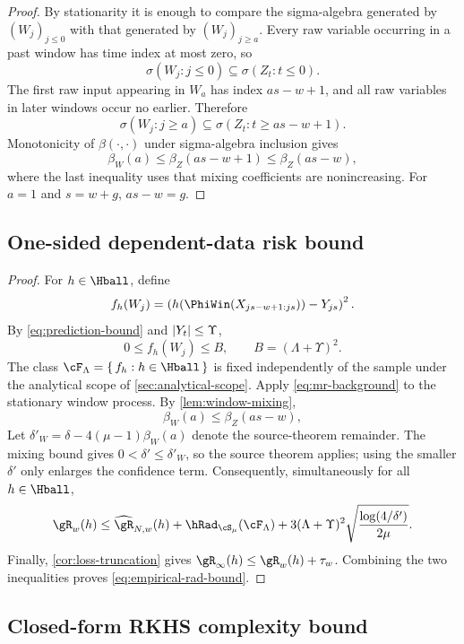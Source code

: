 \begin{proof}
By stationarity it is enough to compare the sigma-algebra generated by
\((W_j)_{j\leq0}\) with that generated by \((W_j)_{j\geq a}\). Every raw
variable occurring in a past window has time index at most zero, so
\[
    \sigma(W_j:j\leq0)
    \subseteq
    \sigma(Z_t:t\leq0).
\]
The first raw input appearing in \(W_a\) has index \(as-w+1\), and all raw
variables in later windows occur no earlier. Therefore
\[
    \sigma(W_j:j\geq a)
    \subseteq
    \sigma(Z_t:t\geq as-w+1).
\]
Monotonicity of \(\beta(\cdot,\cdot)\) under sigma-algebra inclusion gives
\[
    \beta_W(a)
    \leq
    \beta_Z(as-w+1)
    \leq
    \beta_Z(as-w),
\]
where the last inequality uses that mixing coefficients are nonincreasing.
For \(a=1\) and \(s=w+g\), \(as-w=g\).
\end{proof}

\subsection{One-sided dependent-data risk bound}

\begin{proof}
For \(h\in\Hball\), define
\[
    f_h(W_j)
    =
    \left(
      h(\PhiWin(X_{js-w+1:js}))-Y_{js}
    \right)^2.
\]
By \cref{eq:prediction-bound} and \(\left| Y_t \right|\leq\Upsilon\),
\[
    0\leq f_h(W_j)\leq B,
    \qquad B=(\Lambda+\Upsilon)^2.
\]
The class \(\cF_\Lambda=\set{f_h:h\in\Hball}\) is fixed independently of the
sample under the analytical scope of \cref{sec:analytical-scope}. Apply \cref{eq:mr-background} to the
stationary window process. By \cref{lem:window-mixing},
\[
    \beta_W(a)
    \leq\beta_Z(as-w),
\]
Let \(\delta'_W=\delta-4(\mu-1)\beta_W(a)\) denote the source-theorem
remainder. The mixing bound gives \(0<\delta'\leq\delta'_W\), so the source
theorem applies; using the smaller \(\delta'\) only enlarges the confidence
term. Consequently, simultaneously for all \(h\in\Hball\),
\[
    \risk_w(h)
    \leq
    \erisk_{N,w}(h)
    +\hRad_{\cS_\mu}(\cF_\Lambda)
    +3(\Lambda+\Upsilon)^2
      \sqrt{\frac{\log(4/\delta')}{2\mu}}.
\]
Finally, \cref{cor:loss-truncation} gives
\(\risk_\infty(h)\leq\risk_w(h)+\tau_w\). Combining the two inequalities
proves \cref{eq:empirical-rad-bound}.
\end{proof}

\subsection{Closed-form RKHS complexity bound}

